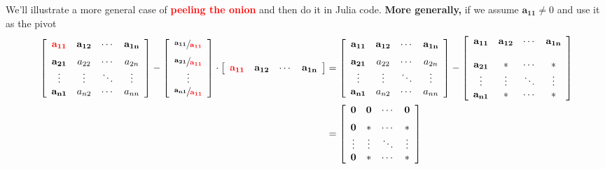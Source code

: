 We'll illustrate a more general case of \textcolor{red}{\bf peeling the onion} and then do it in Julia code.
\textbf{More generally,} if we assume $\mathbf{a_{11}} \neq 0$ and use it as the pivot
\begin{align*}
     \left[\begin{array}{cccc} \mathbf{\RED a_{11}}& \mathbf{a_{12} }& \cdots & \mathbf{a_{1n}} \medskip \\
\mathbf{ a_{21} }& a_{22}& \cdots & a_{2n}  \\
 \vdots & \vdots&  \ddots & \vdots \\
 \mathbf{a_{n1} }& a_{n2}& \cdots & a_{nn} 
 \end{array}\right]- \left[\begin{array}{c} \mathbf{\sfrac{a_{11}}{ \RED a_{11}} } \medskip \\
\mathbf{\sfrac{a_{21}}{\RED a_{11}}} \\
 \vdots \\
 \mathbf{\sfrac{a_{n1}}{ \RED a_{11}} }
 \end{array}\right] \cdot \left[\begin{array}{cccc} \mathbf{\RED a_{11}} & \mathbf{a_{12}} & \cdots & \mathbf{a_{1n} }
 \end{array}\right]&= \left[\begin{array}{cccc} \mathbf{a_{11}}& \mathbf{a_{12} }& \cdots & \mathbf{a_{1n}} \medskip \\
\mathbf{ a_{21} }& a_{22}& \cdots & a_{2n}  \\
 \vdots & \vdots&  \ddots & \vdots \\
 \mathbf{a_{n1} }& a_{n2}& \cdots & a_{nn} 
 \end{array}\right] - \left[\begin{array}{cccc} \mathbf{a_{11}} & \mathbf{a_{12} } & \cdots & \mathbf{a_{1n}} \\
 &\\
 \mathbf{a_{21} }& \ast & \cdots & \ast \\
 \vdots & \vdots&  \ddots & \vdots \\
 \mathbf{a_{n1} }& \ast& \cdots & \ast 
 \end{array}\right]  \bigskip \\
 &= \left[\begin{array}{cccc} \mathbf{0} & \mathbf{0} & \cdots & \mathbf{0} \medskip \\
\mathbf{0} & \ast & \cdots & \ast \\
 \vdots & \vdots&  \ddots & \vdots \\
\mathbf{0} & \ast& \cdots & \ast 
 \end{array}\right]
 \end{align*}
    
